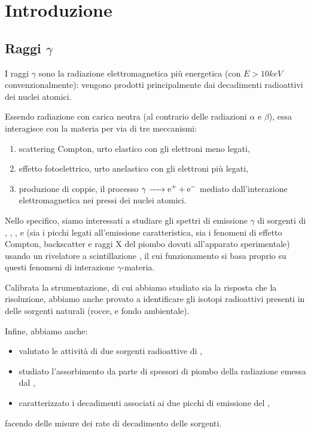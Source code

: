 \section{Introduzione}

\subsection{Raggi $ \gamma $}

I raggi $ \gamma $ sono la radiazione elettromagnetica più energetica (con $ E > 10 \unit{keV} $ convenzionalmente): vengono prodotti principalmente dai decadimenti radioattivi dei nuclei atomici.

Essendo radiazione con carica neutra (al contrario delle radiazioni $ \alpha $ e $ \beta $), essa interagisce con la materia per via di tre meccanismi:
\begin{enumerate}
\item scattering Compton, urto elastico con gli elettroni meno legati,
\item effetto fotoelettrico, urto anelastico con gli elettroni più legati,
\item produzione di coppie, il processo $ \ce{$\gamma$ -> e+ + e-} $ mediato dall'interazione elettromagnetica nei pressi dei nuclei atomici.
\end{enumerate}

Nello specifico, siamo interessati a studiare gli spettri di emissione $ \gamma $ di sorgenti di , , , e  (sia i picchi legati all'emissione caratteristica, sia i fenomeni di effetto Compton, backscatter e raggi X del piombo dovuti all'apparato sperimentale) usando un rivelatore a scintillazione , il cui funzionamento si basa proprio su questi fenomeni di interazione $ \gamma $-materia.

Calibrata la strumentazione, di cui abbiamo studiato sia la risposta che la risoluzione, abbiamo anche provato a identificare gli isotopi radioattivi presenti in delle sorgenti naturali (rocce, e fondo ambientale).

Infine, abbiamo anche:
\begin{itemize}
\item valutato le attività di due sorgenti radioattive di ,
\item studiato l'assorbimento da parte di spessori di piombo della radiazione emessa dal ,
\item caratterizzato i decadimenti associati ai due picchi di emissione del ,
\end{itemize}
facendo delle misure dei rate di decadimento delle sorgenti.

